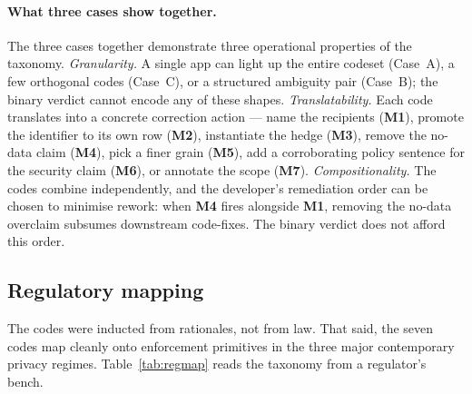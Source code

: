 \documentclass[11pt,a4paper]{article}
\newcommand{\code}[1]{\textsf{\textbf{#1}}}
\begin{document}
\paragraph{What three cases show together.}
The three cases together demonstrate three operational properties of
the taxonomy. \emph{Granularity.} A single app can light up the entire
codeset (Case~A), a few orthogonal codes (Case~C), or a structured
ambiguity pair (Case~B); the binary verdict cannot encode any of these
shapes. \emph{Translatability.} Each code translates into a concrete
correction action --- name the recipients (\code{M1}), promote the
identifier to its own row (\code{M2}), instantiate the hedge (\code{M3}),
remove the no-data claim (\code{M4}), pick a finer grain (\code{M5}),
add a corroborating policy sentence for the security claim (\code{M6}),
or annotate the scope (\code{M7}). \emph{Compositionality.} The codes
combine independently, and the developer's remediation order can be
chosen to minimise rework: when \code{M4} fires alongside \code{M1},
removing the no-data overclaim subsumes downstream code-fixes. The
binary verdict does not afford this order.

\subsection{Regulatory mapping}\label{sec:reg}

The codes were inducted from rationales, not from law. That said, the
seven codes map cleanly onto enforcement primitives in the three major
contemporary privacy regimes. Table~\ref{tab:regmap} reads the
taxonomy from a regulator's bench.
\end{document}
